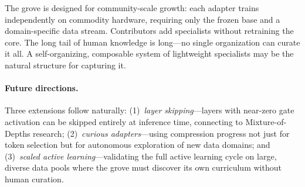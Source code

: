 \documentclass{article}
\begin{document}
The grove is designed for community-scale growth: each adapter trains
independently on commodity hardware, requiring only the frozen base and
a domain-specific data stream. Contributors add specialists without
retraining the core. The long tail of human knowledge is long---no
single organization can curate it all. A self-organizing, composable
system of lightweight specialists may be the natural structure for
capturing it.

\paragraph{Future directions.}
Three extensions follow naturally: (1)~\emph{layer skipping}---layers
with near-zero gate activation can be skipped entirely at inference time,
connecting to Mixture-of-Depths research; (2)~\emph{curious
adapters}---using compression progress not just for token selection but
for autonomous exploration of new data domains; and (3)~\emph{scaled
active learning}---validating the full active learning cycle on large,
diverse data pools where the grove must discover its own curriculum
without human curation.
\end{document}
